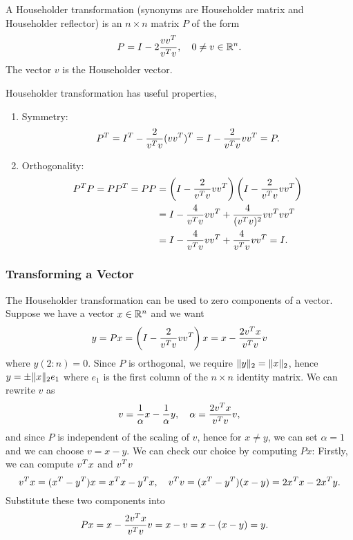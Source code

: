 \begin{definition}
  A Householder transformation (synonyms are Householder matrix and Householder reflector) is an $n\times n$ matrix $P$ of the form
  \begin{equation}\notag
      P = I - 2\frac{vv^T}{v^T v},\quad 0\neq v\in\mathbb{R}^n.
  \end{equation}
  The vector $v$ is the Householder vector.
\end{definition}

Householder transformation has useful properties,
\begin{enumerate}
  \item Symmetry:
  \begin{equation}\notag
      P^T = I^T - \frac{2}{v^T v}(vv^T)^T = I - \frac{2}{v^T v}vv^T = P.
  \end{equation}
  \item Orthogonality:
  \begin{equation}\notag
      \begin{aligned}
          P^T P = PP^T = PP & = \left(I - \frac{2}{v^T v}vv^T\right)\left(I - \frac{2}{v^T v}vv^T\right)\\
          & = I-\frac{4}{v^T v}vv^T + \frac{4}{(v^T v)^2}vv^T vv^T\\
          & = I - \frac{4}{v^T v}vv^T + \frac{4}{v^T v}vv^T = I.
      \end{aligned}
  \end{equation}
\end{enumerate}

\subsubsection{Transforming a Vector}
The Householder transformation can be used to zero components of a vector. Suppose we have a vector $x\in\mathbb{R}^n$ and we want
\begin{equation}\label{eq.2.6}
  y = Px = \left(I - \frac{2}{v^T v}vv^T\right) x = x - \frac{2v^T x}{v^T v}v
\end{equation}
where $y(2:n) = {0}$. Since $P$ is orthogonal, we require $\|{y}\|_2 = \|{x}\|_2$, hence $y = \pm \|{x}\|_2e_1$ where $e_1$ is the first column of the $n\times n$ identity matrix. We can rewrite $v$ as
\begin{equation}\notag
  v = \frac{1}{\alpha} x - \frac{1}{\alpha} y, \quad \alpha = \frac{2v^T x}{v^T v}v,
\end{equation}
and since $P$ is independent of the scaling of $v$, hence for $x\neq y$, we can set $\alpha = 1$ and we can choose $v = x -y$. We can check our choice by computing $Px$:
Firstly, we can compute $v^T x$ and $v^T v$
\begin{equation}\notag
  v^T x = (x^T - y^T) x=x^T x - y^T x,\quad v^T v = (x^T - y^T)(x-y) = 2x^T x - 2x^T y.
\end{equation}
Substitute these two components into 
\begin{equation}\notag
  \begin{aligned}
      Px & = x - \frac{2v^T x}{v^T v}v = x - v = x - (x-y) = y.
  \end{aligned}
\end{equation}

